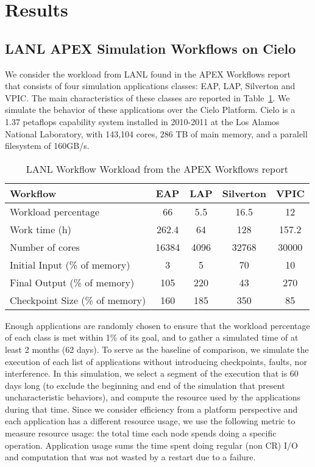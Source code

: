 
\section{Results}\label{sec:results}

\subsection{LANL APEX Simulation Workflows on Cielo}

We consider the workload from LANL found in the APEX Workflows
report~\cite{apex2016} that consists of four simulation applications
classes: EAP, LAP, Silverton and VPIC. The main characteristics of
these classes are reported in Table~\ref{table:lanl}. We simulate the
behavior of these applications over the Cielo Platform. Cielo is a
1.37 petaflops capability system installed in 2010-2011 at the Los
Alamos National Laboratory, with 143,104 cores, 286 TB of main memory,
and a paralell filesystem of 160GB/s.

\begin{table}
\begin{tabular}{|l|c|c|c|c|}
\hline
 Workflow & EAP & LAP & Silverton & VPIC \\\hline
Workload percentage & 66 & 5.5 & 16.5 & 12 \\\hline
Work time (h) & 262.4 & 64 & 128 & 157.2 \\\hline
Number of cores & 16384 & 4096 & 32768 & 30000 \\\hline
Initial Input (\% of memory) &  3 & 5 & 70 & 10 \\\hline
Final Output (\% of memory) & 105 & 220 & 43 & 270 \\\hline
Checkpoint Size (\% of memory) & 160 & 185 & 350 & 85 \\\hline
\end{tabular}
\caption{LANL Workflow Workload from the APEX Workflows report\label{table:lanl}}
\end{table}

Enough applications are randomly chosen to ensure that the workload
percentage of each class is met within 1\% of its goal, and to gather
a simulated time of at least 2 months (62 days). To serve as the
baseline of comparison, we simulate the execution of each list of
applications without introducing checkpoints, faults, nor
interference. In this simulation, we select a segment of the execution
that is 60 days long (to exclude the beginning and end of the
simulation that present uncharacteristic behaviors), and compute
the resource used by the applications during that time. Since we
consider efficiency from a platform perspective and each application
has a different resource usage, we use the following metric to measure
resource usage: the total time each node spends doing a specific
operation. Application usage sums the time spent doing regular (non CR) I/O
and computation that was not wasted by a restart due to a failure.

